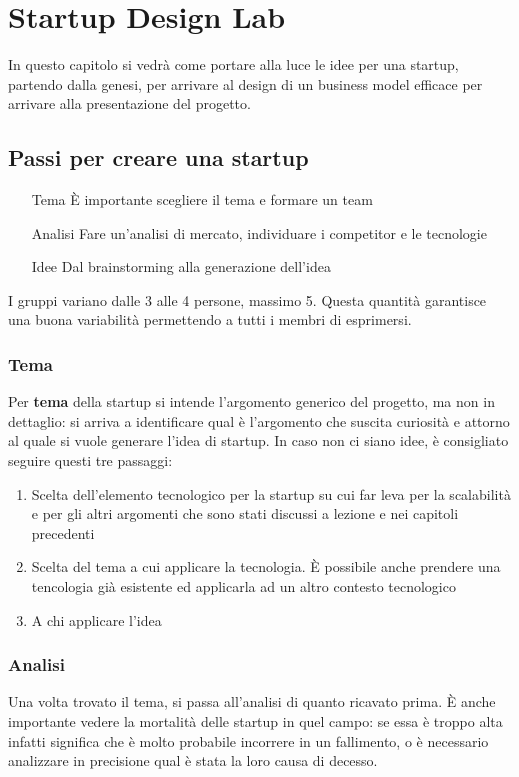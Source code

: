 \chapter{Startup Design Lab}

In questo capitolo si vedrà come portare alla luce le idee per una startup,
partendo dalla genesi, per arrivare al design di un business model efficace per
arrivare alla presentazione del progetto.

\section{Passi per creare una startup}

\begin{itemize}
 \item[Tema] È importante scegliere il tema e formare un team
 \item[Analisi] Fare un'analisi di mercato, individuare i competitor e le
tecnologie
 \item[Idee] Dal brainstorming alla generazione dell'idea
\end{itemize}


I gruppi variano dalle 3 alle 4 persone, massimo 5. Questa quantità garantisce
una buona variabilità permettendo a tutti i membri di esprimersi.

\subsection{Tema}
Per \textbf{tema} della startup si intende l'argomento generico del progetto,
ma non in dettaglio: si arriva a identificare qual è l'argomento che suscita
curiosità e attorno al quale si vuole generare l'idea di startup. In caso non
ci siano idee, è consigliato seguire questi tre passaggi:
\begin{enumerate}
 \item Scelta dell'elemento tecnologico per la startup su cui far leva per la
scalabilità e per gli altri argomenti che sono stati discussi a lezione e nei
capitoli precedenti
 \item Scelta del tema a cui applicare la tecnologia. È possibile anche
prendere una tencologia già esistente ed applicarla ad un altro contesto
tecnologico
 \item A chi applicare l'idea
\end{enumerate}

\subsection{Analisi}
Una volta trovato il tema, si passa all'analisi di quanto ricavato prima.
È anche importante vedere la mortalità delle startup in quel campo: se essa è
troppo alta infatti significa che è molto probabile incorrere in un fallimento,
o è necessario analizzare in precisione qual è stata la loro causa di decesso.

